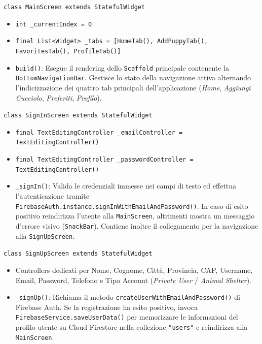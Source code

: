 \documentclass[a4paper]{report}
\begin{document}

\texttt{class MainScreen extends StatefulWidget}
\begin{itemize}
    \item \texttt{int \_currentIndex = 0}
    \item \texttt{final List<Widget> \_tabs = [HomeTab(), AddPuppyTab(), FavoritesTab(), ProfileTab()]}
    \item \texttt{build()}: Esegue il rendering dello \texttt{Scaffold} principale contenente la \texttt{BottomNavigationBar}. Gestisce lo stato della navigazione attiva alternando l'indicizzazione dei quattro tab principali dell'applicazione (\textit{Home}, \textit{Aggiungi Cucciolo}, \textit{Preferiti}, \textit{Profilo}).
\end{itemize}

\texttt{class SignInScreen extends StatefulWidget}
\begin{itemize}
    \item \texttt{final TextEditingController \_emailController = TextEditingController()}
    \item \texttt{final TextEditingController \_passwordController = TextEditingController()}
    \item \texttt{\_signIn()}: Valida le credenziali immesse nei campi di testo ed effettua l'autenticazione tramite \texttt{FirebaseAuth.instance.signInWithEmailAndPassword()}. In caso di esito positivo reindirizza l'utente alla \texttt{MainScreen}, altrimenti mostra un messaggio d'errore visivo (\texttt{SnackBar}). Contiene inoltre il collegamento per la navigazione alla \texttt{SignUpScreen}.
\end{itemize}

\texttt{class SignUpScreen extends StatefulWidget}
\begin{itemize}
    \item Controllers dedicati per Nome, Cognome, Città, Provincia, CAP, Username, Email, Password, Telefono e Tipo Account (\textit{Private User} / \textit{Animal Shelter}).
    \item \texttt{\_signUp()}: Richiama il metodo \texttt{createUserWithEmailAndPassword()} di Firebase Auth. Se la registrazione ha esito positivo, invoca \texttt{FirebaseService.saveUserData()} per memorizzare le informazioni del profilo utente su Cloud Firestore nella collezione \texttt{"users"} e reindirizza alla \texttt{MainScreen}.
\end{itemize}
\end{document}
